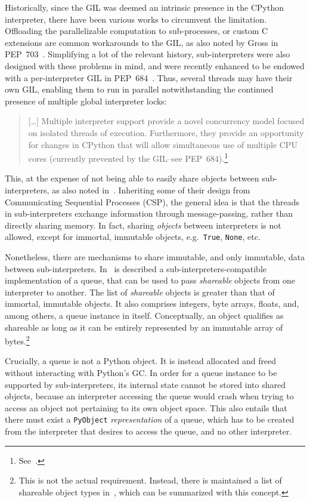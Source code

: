 Historically, since the GIL was deemed an intrinsic presence in the CPython interpreter, there have been various works to circumvent the limitation.
Offloading the parallelizable computation to sub-processes, or custom C extensions are common workarounds to the GIL, as also noted by Gross in PEP~703~\cite{pep703}.
Simplifying a lot of the relevant history, sub-interpreters were also designed with these problems in mind, and were recently enhanced to be endowed with a per-interpreter GIL in PEP~684~\cite{pep684}.
Thus, several threads may have their own GIL, enabling them to run in parallel notwithstanding the continued presence of multiple global interpreter locks:
\begin{quote}
    [\ldots] Multiple interpreter support provide a novel concurrency model focused on isolated threads of execution.
    Furthermore, they provide an opportunity for changes in CPython that will allow simultaneous use of multiple CPU cores (currently prevented by the GIL--see PEP~684).\footnote{See~\cite{pep554}.}
\end{quote}

This, at the expense of not being able to easily share objects between sub-interpreters, as also noted in~\cite[\S~Per-Interpreter GIL]{pep703}.
Inheriting some of their design from Communicating Sequential Processes (CSP), the general idea is that the threads in sub-interpreters exchange information through message-passing, rather than directly sharing memory.
In fact, sharing \emph{objects} between interpreters is not allowed, except for immortal, immutable objects, e.g.\ \texttt{True}, \texttt{None}, etc.

Nonetheless, there are mechanisms to share immutable, and only immutable, data between sub-interpreters.
In~\cite[\S Queue Objects]{pep734} is described a sub-interpreters-compatible implementation of a queue, that can be used to pass \emph{shareable} objects from one interpreter to another.
The list of \emph{shareable} objects is greater than that of immortal, immutable objects.
It also comprises integers, byte arrays, floats, and, among others, a queue instance in itself.
Conceptually, an object qualifies as shareable as long as it can be entirely represented by an immutable array of bytes.\footnote{%
    This is not the actual requirement.
    Instead, there is maintained a list of shareable object types in~\cite[\S Shareable Objects]{pep734}, which can be summarized with this concept.
}

Crucially, a queue is not a Python object.
It is instead allocated and freed without interacting with Python's GC\@.
In order for a queue instance to be supported by sub-interpreters, its internal state cannot be stored into shared objects, because an interpreter accessing the queue would crash when trying to access an object not pertaining to its own object space.
This also entails that there must exist a \texttt{PyObject} \emph{representation} of a queue, which has to be created from the interpreter that desires to access the queue, and no other interpreter.

